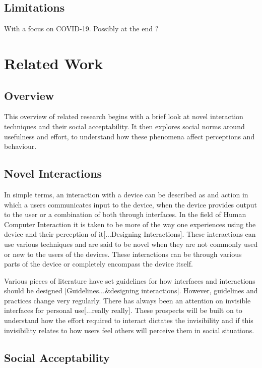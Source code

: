 \documentclass{l4proj}
\begin{document}
\section{Limitations}
With a focus on COVID-19. Possibly at the end ?


\chapter{Related Work}
\section{Overview}

This overview of related research begins with a brief look at novel interaction techniques and their social acceptability. It then explores social norms around usefulness and effort, to understand how these phenomena affect perceptions and behaviour.

\section{Novel Interactions}

In simple terms, an interaction with a device can be described as and action in which a users communicates input to the device, when the device provides output to the user or a combination of both through interfaces. In the field of Human Computer Interaction it is taken to be more of the way one experiences using the device and their perception of it[...Designing Interactions]. These interactions can use various techniques and are said to be novel when they are not commonly used or new to the users of the devices. These interactions can be through various parts of the device or completely encompass the device itself. 

Various pieces of literature have set guidelines for how interfaces and interactions should be designed [Guidelines...&designing interactions]. However, guidelines and practices change very regularly. There has always been an attention on invisible interfaces for personal use[...really really]. These prospects will be built on to understand how the effort required to interact dictates the invisibility and if this invisibility relates to how users feel others will perceive them in social situations.

\section{Social Acceptability}
\end{document}
